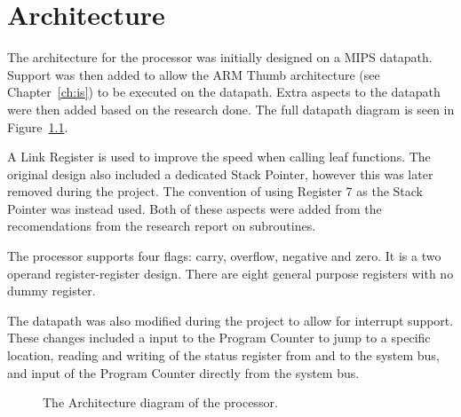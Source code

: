

\chapter{Architecture}




The architecture for the processor was initially designed on a MIPS datapath.
Support was then added to allow the ARM Thumb architecture (see Chapter~\ref{ch:is}) to be executed on the datapath.
Extra aspects to the datapath were then added based on the research done. 
The full datapath diagram is seen in Figure~\ref{fig:architecture}.

A Link Register is used to improve the speed when calling leaf functions.
The original design also included a dedicated Stack Pointer, however this was later removed during the project.
The convention of using Register 7 as the Stack Pointer was instead used. 
Both of these aspects were added from the recomendations from the research report on subroutines.

The processor supports four flags: carry, overflow, negative and zero. 
It is a two operand register-register design.
There are eight general purpose registers with no dummy register. 

The datapath was also modified during the project to allow for interrupt support.
These changes included a input to the Program Counter to jump to a specific location, reading and writing of the status register from and to the system bus, and input of the Program Counter directly from the system bus. 


\begin{figure}
\vspace*{-1.5in}
\caption{The Architecture diagram of the processor.}
\label{fig:architecture}
\end{figure}

